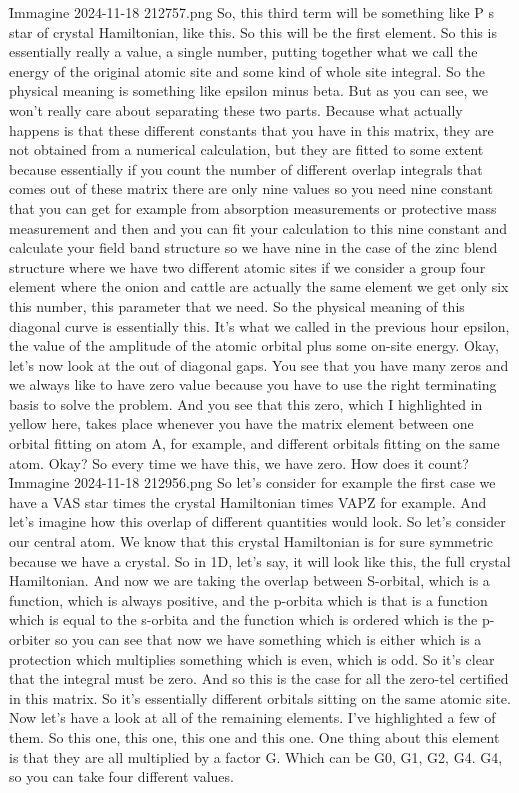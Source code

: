 \f{Immagine 2024-11-18 212757.png}
So, this third term will be something like P s star of crystal Hamiltonian, like this. So this will be the first element. So this is essentially really a value, a single number, putting together what we call the energy of the original atomic site and some kind of whole site integral. So the physical meaning is something like epsilon minus beta. But as you can see, we won't really care about separating these two parts.
Because what actually happens is that these different constants that you have in this matrix, they are not obtained from a numerical calculation, but they are fitted to some extent because essentially if you count the number of different overlap integrals that comes out of these matrix there are only nine values so you need nine constant that you can get for example from absorption measurements or protective mass measurement and then and you can fit your calculation to this nine constant and calculate your field band structure so we have nine in the case of the zinc blend structure where we have two different atomic sites if we consider a group four element where the onion and cattle are actually the same element we get only six this number, this parameter that we need. So the physical meaning of this diagonal curve is essentially this. It's what we called in the previous hour epsilon, the value of the amplitude of the atomic orbital plus some on-site energy. Okay, let's now look at the out of diagonal gaps. You see that you have many zeros and we always like to have zero value because you have to use the right terminating basis to solve the problem. And you see that this zero, which I highlighted in yellow here, takes place whenever you have the matrix element between one orbital fitting on atom A, for example, and different orbitals fitting on the same atom. Okay? So every time we have this, we have zero. How does it count?
\f{Immagine 2024-11-18 212956.png}
So let's consider for example the first case we have a VAS star times the crystal Hamiltonian times VAPZ for example. And let's imagine how this overlap of different quantities would look. So let's consider our central atom. We know that this crystal Hamiltonian is for sure symmetric because we have a crystal. So in 1D, let's say, it will look like this, the full crystal Hamiltonian. And now we are taking the overlap between S-orbital, which is a function, which is always positive, and the p-orbita which is that is a function which is equal to the s-orbita and the function which is ordered which is the p-orbiter so you can see that now we have something which is either which is a protection which multiplies something which is even, which is odd. So it's clear that the integral must be zero. And so this is the case for all the zero-tel certified in this matrix. So it's essentially different orbitals sitting on the same atomic site. Now let's have a look at all of the remaining elements. I've highlighted a few of them. So this one, this one, this one and this one. One thing about this element is that they are all multiplied by a factor G. Which can be G0, G1, G2, G4. G4, so you can take four different values.
